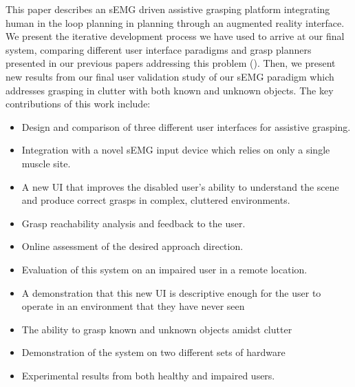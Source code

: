 This paper describes an sEMG driven assistive grasping platform integrating human in the loop planning in planning through an augmented reality interface. We present the iterative development process we have used to arrive at our final system, comparing different user interface paradigms and grasp planners presented in our previous papers addressing this problem (\cite{Weisz2012c,Weisz2013,Weisz2014}).  Then, we present new results from our final user validation study of our sEMG paradigm which addresses grasping in clutter with both known and unknown objects.
The key contributions of this work include:
\begin{itemize}

\item 
Design and comparison of three different user interfaces for assistive grasping.
\item
Integration  with  a  novel  sEMG  input  device  which  relies  on
only  a  single  muscle  site.
\item
A  new  UI  that  improves  the
disabled  user’s  ability  to  understand  the  scene  and  produce
correct grasps in complex, cluttered environments.
\item
Grasp reachability analysis and feedback to the user.
\item
Online assessment of the desired approach direction.
\item
Evaluation of this system on an impaired user in a remote location.
\item
A demonstration
that this new UI is descriptive enough for the user to operate
in an environment that they have never seen
\item 
The ability to grasp known and unknown objects amidst clutter
\item
Demonstration of the system on two different sets of hardware
\item 
Experimental results from both healthy and impaired users.
\end{itemize}
